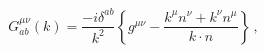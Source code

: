 \begin{equation}  \label{wrongprop}
G^{\mu\nu}_{ab}(k) = \frac {-i\delta ^{ab}}{k^2}\left \{g^{\mu\nu}-\frac{
k^\mu n^\nu+k^\nu n^\mu}{k\cdot n}\right \}\,,
\end{equation}

